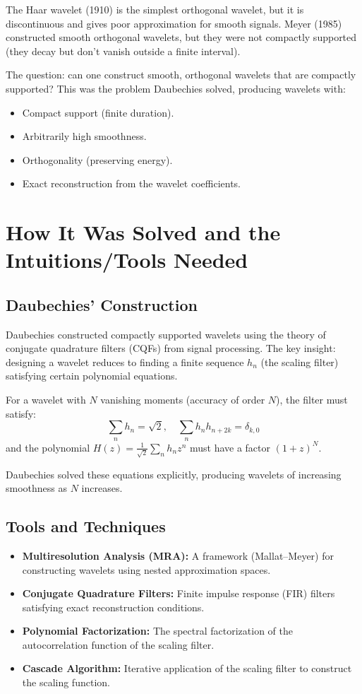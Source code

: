 The Haar wavelet (1910) is the simplest orthogonal wavelet, but it is discontinuous and gives poor approximation for smooth signals. Meyer (1985) constructed smooth orthogonal wavelets, but they were not compactly supported (they decay but don't vanish outside a finite interval).

The question: can one construct smooth, orthogonal wavelets that are compactly supported? This was the problem Daubechies solved, producing wavelets with:
\begin{itemize}
    \item Compact support (finite duration).
    \item Arbitrarily high smoothness.
    \item Orthogonality (preserving energy).
    \item Exact reconstruction from the wavelet coefficients.
\end{itemize}

\section{How It Was Solved and the Intuitions/Tools Needed}

\subsection{Daubechies' Construction}

Daubechies constructed compactly supported wavelets using the theory of conjugate quadrature filters (CQFs) from signal processing. The key insight: designing a wavelet reduces to finding a finite sequence $h_n$ (the scaling filter) satisfying certain polynomial equations.

For a wavelet with $N$ vanishing moments (accuracy of order $N$), the filter must satisfy:
\[
\sum_n h_n = \sqrt{2}, \quad \sum_n h_n h_{n+2k} = \delta_{k,0}
\]
and the polynomial $H(z) = \frac{1}{\sqrt{2}} \sum_n h_n z^n$ must have a factor $(1+z)^N$.

Daubechies solved these equations explicitly, producing wavelets of increasing smoothness as $N$ increases.

\subsection{Tools and Techniques}

\begin{itemize}
    \item \textbf{Multiresolution Analysis (MRA):} A framework (Mallat--Meyer) for constructing wavelets using nested approximation spaces.
    \item \textbf{Conjugate Quadrature Filters:} Finite impulse response (FIR) filters satisfying exact reconstruction conditions.
    \item \textbf{Polynomial Factorization:} The spectral factorization of the autocorrelation function of the scaling filter.
    \item \textbf{Cascade Algorithm:} Iterative application of the scaling filter to construct the scaling function.
\end{itemize}

